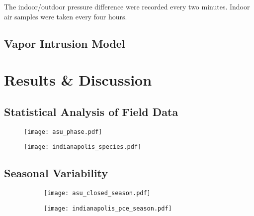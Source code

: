 \documentclass[journal=esthag,manuscript=article]{achemso}
\begin{document}
The indoor/outdoor pressure difference were recorded every two minutes.
Indoor air samples were taken every four hours.

\subsection{Vapor Intrusion Model}



\section{Results & Discussion}

\subsection{Statistical Analysis of Field Data}



\begin{figure}[!h]
	\centering
	\begin{minipage}[c]{0.49\textwidth}
		\centering
    \caption{ }
    \label{fig:asu_phase}
    \texttt{[image: asu\_phase.pdf]}
	\end{minipage}
	\begin{minipage}[c]{0.49\textwidth}
		\centering
    \caption{ }
    \label{fig:indianapolis_species}
    \texttt{[image: indianapolis\_species.pdf]}
	\end{minipage}
\end{figure}


\subsection{Seasonal Variability}

\begin{figure}[htb!]
  \caption{ }
  \label{fig:seasonal_analysis}
  \begin{subfigure}{0.49\textwidth}
    \centering
    \caption{ }
    \label{fig:seasonal_analysis_asu}
    \texttt{[image: asu\_closed\_season.pdf]}
  \end{subfigure}
  \begin{subfigure}{0.49\textwidth}
    \centering
    \caption{ }
    \label{fig:seasonal_analysis_indianapolis}
    \texttt{[image: indianapolis\_pce\_season.pdf]}
  \end{subfigure}
\end{figure}
\end{document}
